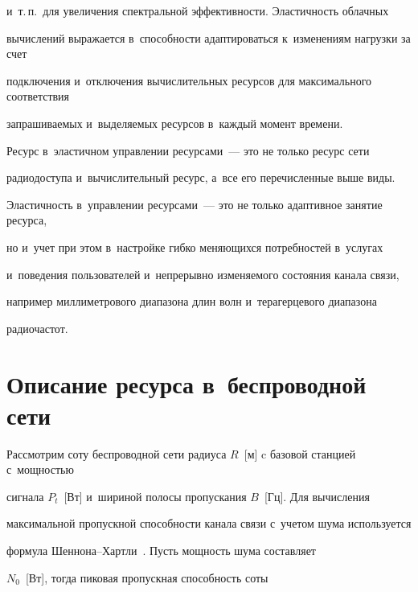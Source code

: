 и~т.\,п.\ для увеличения спектральной эффективности. Эластичность облачных 


вычислений выражается в~спо\-соб\-ности адаптироваться к~изменениям нагрузки за счет 


подключения и~отключения вычислительных ресурсов для максимального соответствия 


запрашиваемых и~выделяемых ресурсов в~каждый момент времени.





Ресурс в~эластичном управлении ресурсами~--- это не только ресурс сети 


радиодоступа и~вычислительный ресурс, а~все его перечисленные выше виды. 


Эластичность в~управлении ресурсами~--- это не только адаптивное занятие ресурса, 


но и~учет при этом в~настройке гибко меняющихся потребностей в~услугах 


и~поведения пользователей и~непрерывно изменяемого состояния канала связи, 


например миллиметрового диапазона длин волн и~терагерцевого диапазона 


радиочастот.











\section{Описание ресурса в~беспроводной сети} \label{sec3}








Рассмотрим соту беспроводной сети радиуса $R$~[м] c базовой станцией с~мощностью 


сигнала $P_t$~[Вт] и~шириной полосы пропускания $B$~[Гц]. Для вычисления 


максимальной пропускной способности канала связи с~учетом шума используется 


формула Шен\-но\-на--Харт\-ли~\cite{Moltchanov2022}. Пусть мощность шума составляет 


$N_0$~[Вт], тогда пиковая пропускная спо\-соб\-ность соты





\noindent


